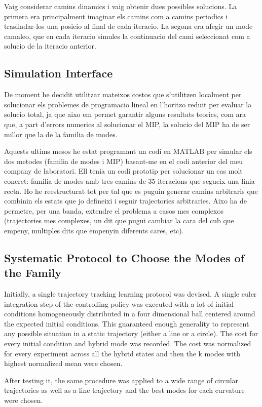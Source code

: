 \documentclass[12,twoside]{TFG-GM}
\theoremstyle{definition}
\theoremstyle{remark}
\begin{document}
Vaig considerar camins dinamics i vaig obtenir dues possibles solucions. La primera era principalment imaginar els camins com a camins periodics i traslladar-los una posicio al final de cada iteracio.
La segona era afegir un mode camaleo, que en cada iteracio simules la continuacio del cami seleccionat com a solucio de la iteracio anterior.

\subsection{Simulation Interface}
\label{subsec:sim}
De moment he decidit utilitzar mateixos costos que s'utilitzen localment per solucionar els problemes de programacio lineal en l'horitzo reduit per evaluar la solucio total, ja que aixo em permet garantir alguns resultats teorics, com ara que, a part d'errors numerics al solucionar el MIP, la solucio del MIP ha de ser millor que la de la familia de modes.

Aquests ultims mesos he estat programant un codi en MATLAB per simular els dos metodes (familia de modes i MIP) basant-me en el codi anterior del meu company de laboratori. Ell tenia un codi prototip per solucionar un cas molt concret: familia de modes amb tres camins de 35 iteracions que segueix una linia recta. Ho he reestructurat tot per tal que es puguin generar camins arbitraris que combinin els estats que jo defineixi i seguir trajectories arbitraries. Aixo ha de permetre, per una banda, extendre el problema a casos mes complexos (trajectories mes complexes, un dit que pugui cambiar la cara del cub que empeny, multiples dits que empenyin diferents cares, etc). 

\subsection{Systematic Protocol to Choose the Modes of the Family}
Initially, a single trajectory tracking learning protocol was devised. A single euler integration step of the controlling policy was executed with a lot of initial conditions homogeneously distributed in a four dimensional ball centered around the expected initial conditions. This guaranteed enough generality to represent any possible situation in a static trajectory (either a line or a circle). The cost for every initial condition and hybrid mode was recorded. The cost was normalized for every experiment across all the hybrid states and then the k modes with highest normalized mean were chosen.

After testing it, the same procedure was applied to a wide range of circular trajectories as well as a line trajectory and the best modes for each curvature were chosen.
\end{document}
